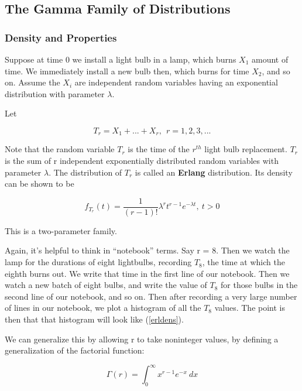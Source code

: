 \subsection{The Gamma Family of Distributions}
\label{gammafam}

\subsubsection{Density and Properties}
\label{gammaprops}

Suppose at time 0 we install a light bulb in a lamp, which burns $X_1$
amount of time.  We immediately install a new bulb then, which burns for
time $X_2$, and so on.  Assume the $X_i$ are independent random
variables having an exponential distribution with parameter $\lambda$.

Let 

\begin{equation}
T_r = X_1 + ... + X_r, ~~ r = 1,2,3,...
\end{equation}

Note that the random variable $T_r$ is the time of the $r^{th}$ light
bulb replacement.  $T_r$ is the sum of r independent exponentially
distributed random variables with parameter $\lambda$.  The distribution
of $T_r$ is called an {\bf Erlang} distribution.  Its density can be
shown to be

\begin{equation}
\label{erldens}
f_{T_r}(t) = \frac{1}{(r-1)!} \lambda^r t^{r-1} e^{-\lambda t}, ~ t > 0
\end{equation}

This is a two-parameter family.

Again, it's helpful to think in ``notebook'' terms.  Say r = 8.  Then we
watch the lamp for the durations of eight lightbulbs, recording $T_8$,
the time at which the eighth burns out.  We write that time in the first
line of our notebook.  Then we watch a new batch of eight bulbs, and
write the value of $T_8$ for those bulbs in the second line of our
notebook, and so on.  Then after recording a very large number of lines
in our notebook, we plot a histogram of all the $T_8$ values.  The point
is then that that histogram will look like (\ref{erldens}).

We can generalize this by allowing r to take noninteger values, by
defining a generalization of the factorial function:

\begin{equation}
\Gamma(r) = \int_{0}^{\infty} x^{r-1} e^{-x}  ~ dx
\end{equation}

